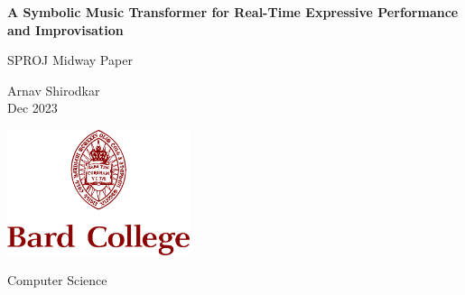 \documentclass[../main.tex]{subfiles}
\begin{document}
\begin{titlepage}
    \begin{center}
        \vspace*{1cm}
            
        \LARGE
        \textbf{A Symbolic Music Transformer for Real-Time Expressive Performance and Improvisation}
            
        \vspace{0.5cm}
        \Large
        SPROJ Midway Paper
            
        \vspace{1.5cm}
            
        \Large
        Arnav Shirodkar\\Dec 2023
            
        \vspace{4cm}
            
        \includegraphics[width=0.4\textwidth]{imgs/bard.png}
        \Large
        
        Computer Science\\
            
    \end{center}
\end{titlepage}
\end{document}
